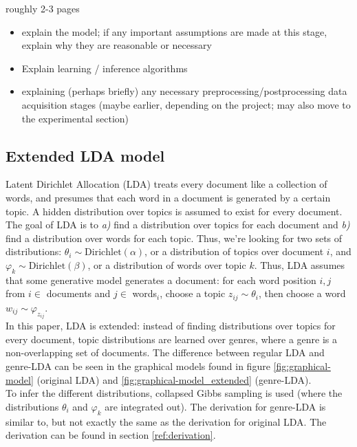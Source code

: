 roughly 2-3 pages
\begin{itemize}
\item explain the model; if any important assumptions are made at this stage, explain why they are reasonable or necessary
\item Explain learning / inference algorithms
\item explaining (perhaps briefly) any necessary preprocessing/postprocessing data acquisition stages (maybe earlier, depending on the project; may also move to the experimental section)
\end{itemize}
\subsection{Extended LDA model}
Latent Dirichlet Allocation (LDA) treats every document like a collection of words, and presumes that each word in a document is generated by a certain topic. A hidden distribution over topics is assumed to exist for every document. The goal of LDA is to \textit{a)} find a distribution over topics for each document and \textit{b)} find a distribution over words for each topic. Thus, we're looking for two sets of distributions: $\theta_i \sim \text{Dirichlet}(\alpha)$, or a distribution of topics over document $i$, and $\varphi_k \sim \text{Dirichlet}(\beta)$, or a distribution of words over topic $k$. Thus, LDA assumes that some generative model generates a document: for each word position $i,j$ from $i \in$ documents and $j \in$ words$_i$, choose a topic $z_{ij} \sim \theta_i$, then choose a word $w_{ij} \sim \varphi_{z_{ij}}$. \\
In this paper, LDA is extended: instead of finding distributions over topics for every document, topic distributions are learned over genres, where a genre is a non-overlapping set of documents. The difference between regular LDA and genre-LDA can be seen in the graphical models found in figure \ref{fig:graphical-model} (original LDA) and \ref{fig:graphical-model_extended} (genre-LDA). \\
To infer the different distributions, collapsed Gibbs sampling is used (where the distributions $\theta_i$ and $\varphi_k$ are integrated out). The derivation for genre-LDA is similar to, but not exactly the same as the derivation for original LDA. The derivation can be found in section \ref{ref:derivation}.\\

